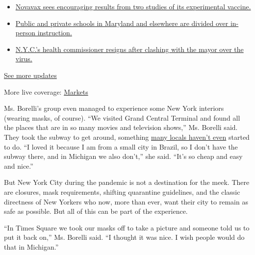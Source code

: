 \begin{itemize}
\tightlist
\item
  \href{https://www.nytimes.com/2020/08/04/world/coronavirus-cases.html?action=click\&pgtype=Article\&state=default\&region=MAIN_CONTENT_1\&context=storylines_live_updates\#link-1228a480}{Novavax
  sees encouraging results from two studies of its experimental
  vaccine.}
\item
  \href{https://www.nytimes.com/2020/08/04/world/coronavirus-cases.html?action=click\&pgtype=Article\&state=default\&region=MAIN_CONTENT_1\&context=storylines_live_updates\#link-4825b93}{Public
  and private schools in Maryland and elsewhere are divided over
  in-person instruction.}
\item
  \href{https://www.nytimes.com/2020/08/04/world/coronavirus-cases.html?action=click\&pgtype=Article\&state=default\&region=MAIN_CONTENT_1\&context=storylines_live_updates\#link-4d1eafa8}{N.Y.C.'s
  health commissioner resigns after clashing with the mayor over the
  virus.}
\end{itemize}

\href{https://www.nytimes.com/2020/08/04/world/coronavirus-cases.html?action=click\&pgtype=Article\&state=default\&region=MAIN_CONTENT_1\&context=storylines_live_updates}{See
more updates}

More live coverage:
\href{https://www.nytimes.com/live/2020/08/04/business/stock-market-today-coronavirus?action=click\&pgtype=Article\&state=default\&region=MAIN_CONTENT_1\&context=storylines_live_updates}{Markets}

Ms. Borelli's group even managed to experience some New York interiors
(wearing masks, of course). ``We visited Grand Central Terminal and
found all the places that are in so many movies and television shows,''
Ms. Borelli said. They took the subway to get around, something
\href{https://www.nytimes.com/2020/07/17/nyregion/coronavirus-subways-spread-nyc.html}{many
locals haven't even} started to do. ``I loved it because I am from a
small city in Brazil, so I don't have the subway there, and in Michigan
we also don't,'' she said. ``It's so cheap and easy and nice.''

But New York City during the pandemic is not a destination for the meek.
There are closures, mask requirements, shifting quarantine guidelines,
and the classic directness of New Yorkers who now, more than ever, want
their city to remain as safe as possible. But all of this can be part of
the experience.

``In Times Square we took our masks off to take a picture and someone
told us to put it back on,'' Ms. Borelli said. ``I thought it was nice.
I wish people would do that in Michigan.''

